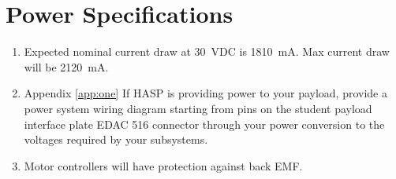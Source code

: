 \newpage
\section{Power Specifications}
\label{sec:Power}

\hspace*{0.5cm}
\begin{minipage}{\linewidth-0.5cm}
  \begin{enumerate}[label=\Alph*.]
    
  \item Expected nominal current draw at \SI{30}{\volt}DC is \SI{1810}{\milli\ampere}.  Max current draw will be \SI{2120}{\milli\ampere}.
    
  \item Appendix \ref{app:one} If HASP is providing power to your payload, provide a power system wiring diagram starting from pins on the student payload interface plate EDAC \num{516} connector through your power conversion to the voltages required by your subsystems.
    
  \item Motor controllers will have protection against back EMF.
    
  \end{enumerate}
\end{minipage}

